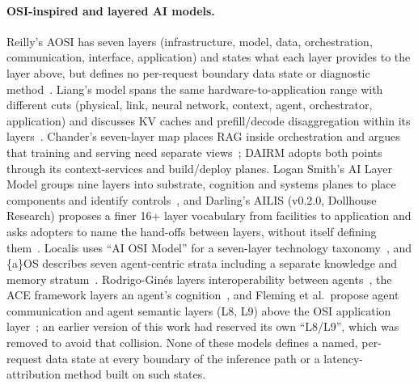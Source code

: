 \documentclass[11pt]{article}
\begin{document}
\paragraph{OSI-inspired and layered AI models.} Reilly's AOSI has seven layers (infrastructure, model, data, orchestration, communication, interface, application) and states what each layer provides to the layer above, but defines no per-request boundary data state or diagnostic method~\cite{reilly2025aosi}. Liang's model spans the same hardware-to-application range with different cuts (physical, link, neural network, context, agent, orchestrator, application) and discusses KV caches and prefill/decode disaggregation within its layers~\cite{liang2025compute}. Chander's seven-layer map places RAG inside orchestration and argues that training and serving need separate views~\cite{chander2026map}; DAIRM adopts both points through its context-services and build/deploy planes. Logan Smith's AI Layer Model groups nine layers into substrate, cognition and systems planes to place components and identify controls~\cite{smith2026ailayer}, and Darling's AILIS (v0.2.0, Dollhouse Research) proposes a finer 16+ layer vocabulary from facilities to application and asks adopters to name the hand-offs between layers, without itself defining them~\cite{ailis}. Localis uses ``AI OSI Model'' for a seven-layer technology taxonomy~\cite{localis}, and \{a\}OS describes seven agent-centric strata including a separate knowledge and memory stratum~\cite{aos7}. Rodrigo-Gin\'es layers interoperability between agents~\cite{rodrigogines2025osi}, the ACE framework layers an agent's cognition~\cite{shapiro2023ace}, and Fleming et al.\ propose agent communication and agent semantic layers (L8, L9) above the OSI application layer~\cite{fleming2025ioa}; an earlier version of this work had reserved its own ``L8/L9'', which was removed to avoid that collision. None of these models defines a named, per-request data state at every boundary of the inference path or a latency-attribution method built on such states.
\end{document}
